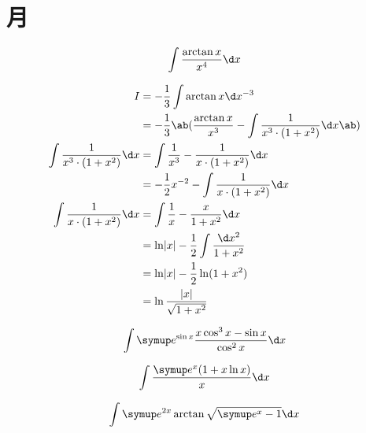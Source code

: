 \section{月}

\begin{question}
    \begin{equation*}
        \int\frac{\arctan x}{x^4} \d x
    \end{equation*}
\end{question}
\begin{solution}
    \begin{align*}
        I &= -\frac 1 3 \int \arctan x \d x^{-3}    \\
        &= -\frac 1 3 \ab( \frac{\arctan x}{x^3} - \int \frac{1}{x^3 \cdot (1 + x^2)} \d x \ab)  \\
        \int \frac{1}{x^3 \cdot (1 + x^2)} \d x &=\int \frac{1}{x^3} - \frac{1}{x \cdot (1 + x^2)} \d x \\
        &= -\frac 1 2 x^{-2} - \int \frac{1}{x \cdot (1 + x^2)} \d x    \\
        \int \frac{1}{x \cdot (1 + x^2)} \d x &= \int \frac 1 x - \frac{x}{1 + x^2} \d x    \\
        &= \ln\abs{x} - \frac 1 2 \int \frac{\d x^2}{1 + x^2}   \\
        &= \ln\abs{x} - \frac 1 2 \ln(1 + x^2)  \\
        &= \ln\frac{\abs{x}}{\sqrt{1 + x^2}}
    \end{align*}
\end{solution}

\begin{question}
    \begin{equation*}
        \int \me^{ \sin x } \frac{ x \cos^3 x - \sin x }{ \cos^2 x } \d x
    \end{equation*}
\end{question}

\begin{question}
    \begin{equation*}
        \int \frac{ \me^x ( 1 + x \ln x ) }{ x } \d x
    \end{equation*}
\end{question}

\begin{question}
    \begin{equation*}
        \int \me^{2x} \arctan \sqrt{ \me^x - 1 } \d x
    \end{equation*}
\end{question}

